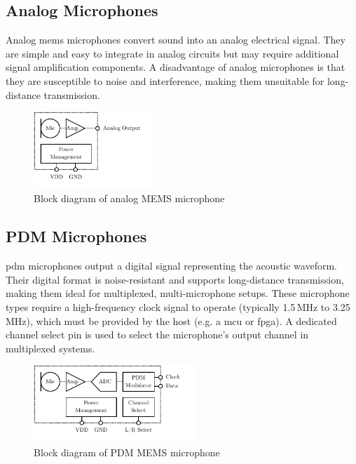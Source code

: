 \subsection{Analog Microphones}
Analog \acrshort{mems} microphones convert sound into an analog electrical signal.
They are simple and easy to integrate in analog circuits but may require additional signal amplification components.
A disadvantage of analog microphones is that they are susceptible to noise and interference, making them unsuitable for long-distance transmission.
\begin{figure}[h!]
	\centering
	\vspace{-0.1cm}
	\includegraphics[height=2.9cm, trim={0 0.4cm 0 0}]{images/2_preliminaries/mems_microphone_types_analog.pdf}
	\caption{Block diagram of analog MEMS microphone}
	\label{fig:mems_microphone_types_analog}
\end{figure}

\subsection{PDM Microphones}
\acrshort{pdm} microphones output a digital signal representing the acoustic waveform.
Their digital format is noise-resistant and supports long-distance transmission, making them ideal for multiplexed, multi-microphone setups.
These microphone types require a high-frequency clock signal to operate (typically 1.5\,MHz to 3.25\,MHz),
which must be provided by the host (e.g. a \acrshort{mcu} or \acrshort{fpga}).
A dedicated channel select pin is used to select the microphone's output channel in multiplexed systems.
\begin{figure}[h!]
	\centering
	\vspace{-0.1cm}
	\includegraphics[height=2.9cm, trim={0 0.4cm 0 0}]{images/2_preliminaries/mems_microphone_types_pdm.pdf}
	\caption{Block diagram of PDM MEMS microphone}
	\label{fig:mems_microphone_types_pdm}
\end{figure}

